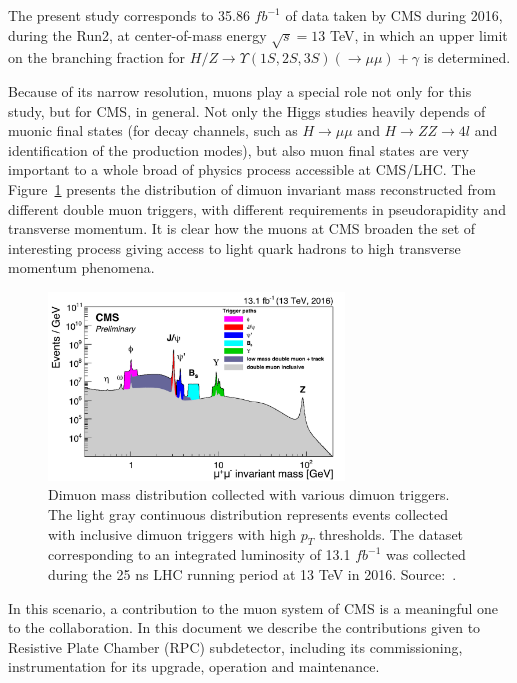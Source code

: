 The present study corresponds to 35.86 $fb^{-1}$ of data taken by CMS during 2016, during the Run2, at center-of-mass energy $\sqrt{s} = 13$ TeV, in which an upper limit on the branching fraction for $H/Z \rightarrow \Upsilon(1S, 2S, 3S) (\rightarrow \mu\mu) + \gamma $ is determined.

Because of its narrow resolution, muons play a special role not only for this study, but for CMS, in general. Not only the Higgs studies heavily depends of muonic final states (for decay channels, such as $H \rightarrow \mu\mu$ and $H \rightarrow ZZ \rightarrow 4l$ and identification of the production modes), but also muon final states are very important to a whole broad of physics process accessible at CMS/LHC. The Figure~\ref{dimuon_invariant_mass} presents the distribution of dimuon invariant mass reconstructed from different double muon triggers, with different requirements in pseudorapidity and transverse momentum. It is clear how the muons at CMS broaden the set of interesting process giving access to light quark hadrons to high transverse momentum phenomena.

\begin{figure}[htbp]
    \centering
    \includegraphics[width=0.7\textwidth]{figures_and_tables/introduction/dimuon_inv_mass.pdf}
    \caption{Dimuon mass distribution collected with various dimuon triggers. The light gray continuous distribution represents events collected with inclusive dimuon triggers with high $p_T$ thresholds. The dataset corresponding to an integrated luminosity of 13.1 $fb^{-1}$ was collected during the 25 ns LHC  running period at 13 TeV in 2016. Source:~\cite{dimuon_inv_mass}.}
    \label{dimuon_invariant_mass}
\end{figure}

In this scenario, a contribution to the muon system of CMS is a meaningful one to the collaboration. In this document we describe the contributions given to Resistive Plate Chamber (RPC) subdetector, including its commissioning, instrumentation for its upgrade, operation and maintenance.

